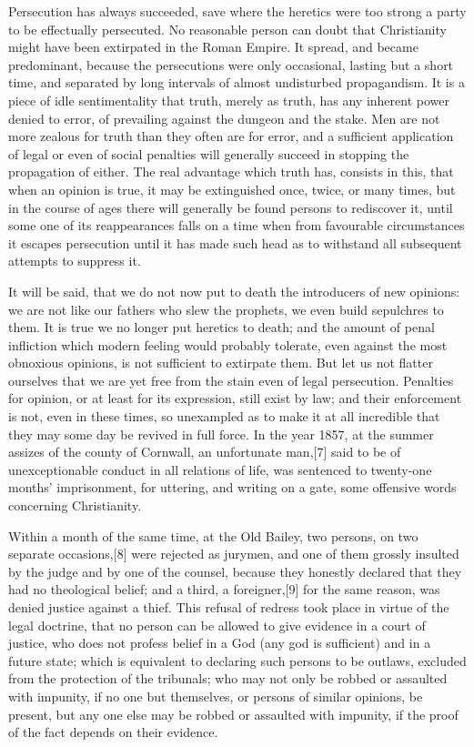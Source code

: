 Persecution has always succeeded, save where the heretics were too strong a party to be effectually persecuted. No reasonable person can doubt that Christianity might have been extirpated in the Roman Empire. It spread, and became predominant, because the persecutions were only occasional, lasting but a short time, and separated by long intervals of almost undisturbed propagandism. It is a piece of idle sentimentality that truth, merely as truth, has any inherent power denied to error, of prevailing against the dungeon and the stake. Men are not more zealous for truth than they often are for error, and a sufficient application of legal or even of social penalties will generally succeed in stopping the propagation of either. The real advantage which truth has, consists in this, that when an opinion is true, it may be extinguished once, twice, or many times, but in the course of ages there will generally be found persons to rediscover it, until some one of its reappearances falls on a time when from favourable circumstances it escapes persecution until it has made such head as to withstand all subsequent attempts to suppress it.\par

It will be said, that we do not now put to death the introducers of new opinions: we are not like our fathers who slew the prophets, we even build sepulchres to them. It is true we no longer put heretics to death; and the amount of penal infliction which modern feeling would probably tolerate, even against the most obnoxious opinions, is not sufficient to extirpate them. But let us not flatter ourselves that we are yet free from the stain even of legal persecution. Penalties for opinion, or at least for its expression, still exist by law; and their enforcement is not, even in these times, so unexampled as to make it at all incredible that they may some day be revived in full force. In the year 1857, at the summer assizes of the county of Cornwall, an unfortunate man,[7] said to be of unexceptionable conduct in all relations of life, was sentenced to twenty-one months’ imprisonment, for uttering, and writing on a gate, some offensive words concerning Christianity.\par

Within a month of the same time, at the Old Bailey, two persons, on two separate occasions,[8] were rejected as jurymen, and one of them grossly insulted by the judge and by one of the counsel, because they honestly declared that they had no theological belief; and a third, a foreigner,[9] for the same reason, was denied justice against a thief. This refusal of redress took place in virtue of the legal doctrine, that no person can be allowed to give evidence in a court of justice, who does not profess belief in a God (any god is sufficient) and in a future state; which is equivalent to declaring such persons to be outlaws, excluded from the protection of the tribunals; who may not only be robbed or assaulted with impunity, if no one but themselves, or persons of similar opinions, be present, but any one else may be robbed or assaulted with impunity, if the proof of the fact depends on their evidence.\par

